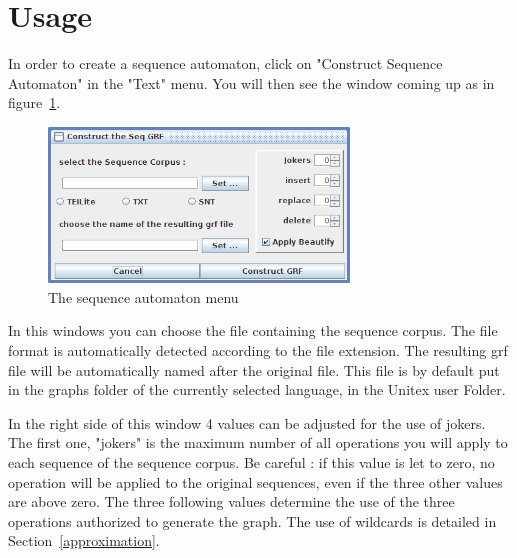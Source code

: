 \section{Usage}
In order to create a sequence automaton, click on "Construct Sequence Automaton" in the "Text" menu. You will then see the window coming up as in figure~\ref{fig8-4SequenceGRF}.
\begin{figure}[h!]
	\begin{minipage}[h!]{0.5\linewidth}	
		\centering
			\includegraphics[width=8cm]{resources/img/fig7-seq2grf1.png}
			\caption{The sequence automaton menu\label{fig8-4SequenceGRF}}
	\end{minipage}
\end{figure}

\pagebreak
In this windows you can choose the file containing the sequence corpus. 
The file format is automatically detected according to the file extension.
The resulting grf file will be automatically named after the original file. This file is by default put in the graphs folder of the currently selected language, in the Unitex user Folder.
\medskip

In the right side of this window 4 values can be adjusted for the use of jokers.
The first one, "jokers" is the maximum number of all operations you will apply to each sequence of the sequence corpus. 
Be careful : if this value is let to zero, no operation will be applied to the original sequences, even if the three other values are above zero. The three following values determine the use of the three operations authorized to generate the graph. The use of wildcards is detailed in Section~\ref{approximation}.
\medskip


